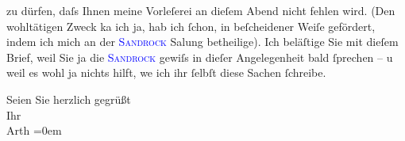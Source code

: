                zu dürfen, daſs Ihnen meine Vorleſerei an dieſem Abend nicht fehlen
               wird. (Den wohltätigen Zweck ka{\geminationn} ich ja, hab ich ſchon,
               in beſcheidener Weiſe gefördert, indem ich mich an der \textsc{\textcolor{blue}{Sandrock}{}\ledrightnote{\textcolor{blue}{Adele Sandrock}}} Sa{\geminationm}lung betheilige{\dotstwo}).
               Ich beläſtige Sie {\pb}mit dieſem Brief, weil Sie
               ja die \textsc{\textcolor{blue}{Sandrock}{}\ledrightnote{\textcolor{blue}{Adele Sandrock}}} gewiſs in dieſer Angelegenheit bald ſprechen – u weil es wohl ja nichts hilft,
                  we{\geminationn} ich ihr ſelbſt diese Sachen ſchreibe.\pend
           
\pstart
           Seien Sie herzlich gegrüßt {\\[\baselineskip]}Ihr {\\[\baselineskip]}\spacefill\mbox{Arth}\pend
           \leftskip=0em{}\endnumbering{}  
      